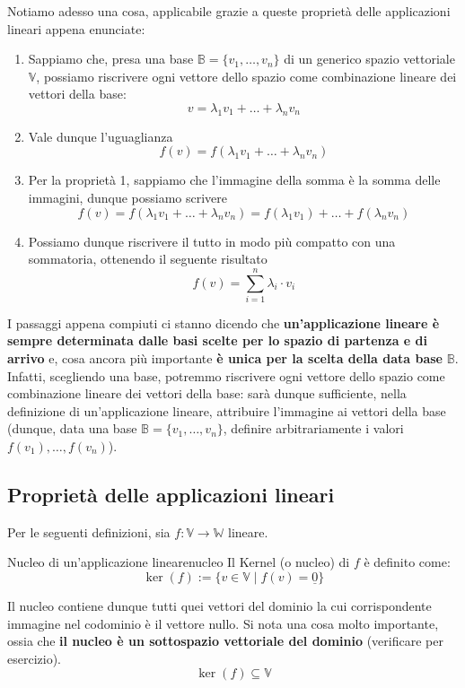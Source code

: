 \documentclass[12pt]{report}
\newcommand{\V}{\mathbb{V}}
\newcommand{\W}{\mathbb{W}}
\newcommand{\vectors}[1]{#1_1, \dots, #1_n}
\newcommand{\nullvector}{\underline{0}}
\begin{document}
	Notiamo adesso una cosa, applicabile grazie a queste proprietà delle applicazioni lineari appena enunciate:
	\begin{enumerate}
		\item Sappiamo che, presa una base $\mathbb{B} = \{\vectors{v}\}$ di un generico spazio vettoriale $\V$, possiamo riscrivere ogni vettore dello spazio come combinazione lineare dei vettori della base:
		\[
			v = \lambda_1v_1 + \dots + \lambda_nv_n
		\]
		\item Vale dunque l'uguaglianza
		\[
			f(v) = f(\lambda_1v_1 + \dots + \lambda_nv_n)
		\]
		\item Per la proprietà 1, sappiamo che l'immagine della somma è la somma delle immagini, dunque possiamo scrivere
		\[
			f(v) = f(\lambda_1v_1 + \dots + \lambda_nv_n) = f(\lambda_1v_1) + \dots + f(\lambda_nv_n)
		\]
		\item Possiamo dunque riscrivere il tutto in modo più compatto con una sommatoria, ottenendo il seguente risultato
		\[
			f(v) = \sum_{i=1}^{n} \lambda_i \cdot v_i
		\]
	\end{enumerate}
	I passaggi appena compiuti ci stanno dicendo che \textbf{un'applicazione lineare è sempre determinata dalle basi scelte per lo spazio di partenza e di arrivo} e, cosa ancora più importante \textbf{è unica per la scelta della data base} $\mathbb{B}$.
	Infatti, scegliendo una base, potremmo riscrivere ogni vettore dello spazio come combinazione lineare dei vettori della base: sarà dunque sufficiente, nella definizione di un'applicazione lineare, attribuire l'immagine ai vettori della base (dunque, data una base $\mathbb{B} = \{\vectors{v}\}$, definire arbitrariamente i valori $f(v_1), \dots, f(v_n)$).
	
	\subsection{Proprietà delle applicazioni lineari}
	Per le seguenti definizioni, sia $f: \V \to \W$ lineare.
	
	\begin{definizione}{Nucleo di un'applicazione lineare}{nucleo}
		Il Kernel (o nucleo) di $f$ è definito come:
		\[
		\ker(f) := \{v \in \V \mid f(v) = \nullvector\}
		\]
	\end{definizione}
	Il nucleo contiene dunque tutti quei vettori del dominio la cui corrispondente immagine nel codominio è il vettore nullo.
	Si nota una cosa molto importante, ossia che \textbf{il nucleo è un sottospazio vettoriale del dominio} (verificare per esercizio).
	\[
	\ker(f) \subseteq \V
	\]
	
\end{document}
